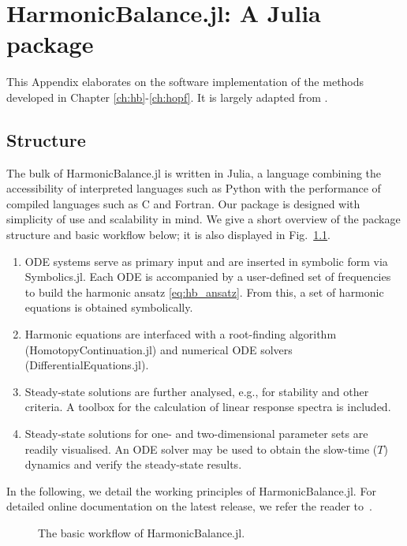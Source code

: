 	
\chapter{HarmonicBalance.jl: A Julia package} \label{app:hb}
	
This Appendix elaborates on the software implementation of the methods developed in Chapter \ref{ch:hb}-\ref{ch:hopf}. It is largely adapted from \cite{Kosata_2022a}.
	
\section{Structure}

The bulk of HarmonicBalance.jl is written in Julia, a language combining the accessibility of interpreted languages such as Python with the performance of compiled languages such as C and Fortran. Our package is designed with simplicity of use and scalability in mind. We give a short overview of the package structure and basic workflow below; it is also displayed in Fig.~\ref{fig:app_workflow}.
\begin{enumerate}
	\item ODE systems serve as primary input and are inserted in symbolic form via Symbolics.jl. Each ODE is accompanied by a user-defined set of frequencies to build the harmonic ansatz \eqref{eq:hb_ansatz}. From this, a set of harmonic equations is obtained symbolically.
	\item Harmonic equations are interfaced with a root-finding algorithm (HomotopyContinuation.jl) and numerical ODE solvers (DifferentialEquations.jl).
	\item  Steady-state solutions are further analysed, e.g., for stability and other criteria. A toolbox for the calculation of linear response spectra is included. 
	\item Steady-state solutions for one- and two-dimensional parameter sets are readily visualised. An ODE solver may be used to obtain the slow-time ($T$) dynamics and verify the steady-state results.
\end{enumerate}

In the following, we detail the working principles of HarmonicBalance.jl. For detailed online documentation on the latest release, we refer the reader to~\cite{harmonic_balance_docs}.

\begin{figure} [h!]
	\centering
	
	\caption{The basic workflow of HarmonicBalance.jl.}
	\label{fig:app_workflow}
\end{figure}

